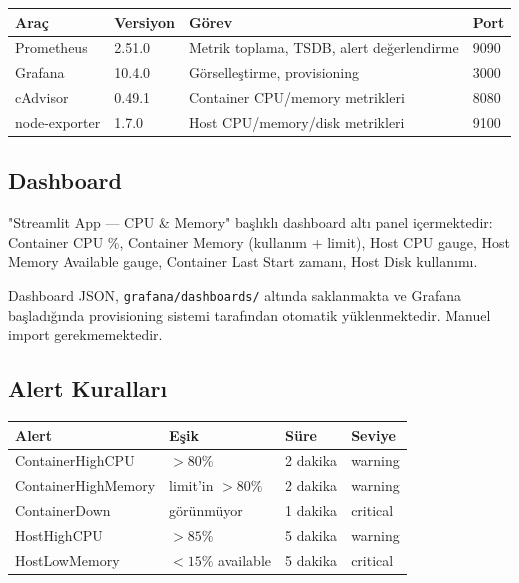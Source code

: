 \documentclass[12pt,a4paper]{article}
\begin{document}
\begin{center}
\begin{tabular}{llll}
\toprule
\textbf{Araç} & \textbf{Versiyon} & \textbf{Görev} & \textbf{Port} \\
\midrule
Prometheus     & 2.51.0 & Metrik toplama, TSDB, alert değerlendirme & 9090 \\
Grafana        & 10.4.0 & Görselleştirme, provisioning              & 3000 \\
cAdvisor       & 0.49.1 & Container CPU/memory metrikleri           & 8080 \\
node-exporter  & 1.7.0  & Host CPU/memory/disk metrikleri           & 9100 \\
\bottomrule
\end{tabular}
\end{center}

\subsection{Dashboard}

"Streamlit App — CPU \& Memory" başlıklı dashboard altı panel
içermektedir: Container CPU \%, Container Memory (kullanım + limit),
Host CPU gauge, Host Memory Available gauge, Container Last Start
zamanı, Host Disk kullanımı.

Dashboard JSON, \texttt{grafana/dashboards/} altında saklanmakta
ve Grafana başladığında provisioning sistemi tarafından otomatik
yüklenmektedir. Manuel import gerekmemektedir.

\subsection{Alert Kuralları}

\begin{center}
\begin{tabular}{llll}
\toprule
\textbf{Alert} & \textbf{Eşik} & \textbf{Süre} & \textbf{Seviye} \\
\midrule
ContainerHighCPU    & $>80\%$         & 2 dakika & warning  \\
ContainerHighMemory & limit'in $>80\%$& 2 dakika & warning  \\
ContainerDown       & görünmüyor      & 1 dakika & critical \\
HostHighCPU         & $>85\%$         & 5 dakika & warning  \\
HostLowMemory       & $<15\%$ available & 5 dakika & critical \\
\bottomrule
\end{tabular}
\end{center}
\end{document}
